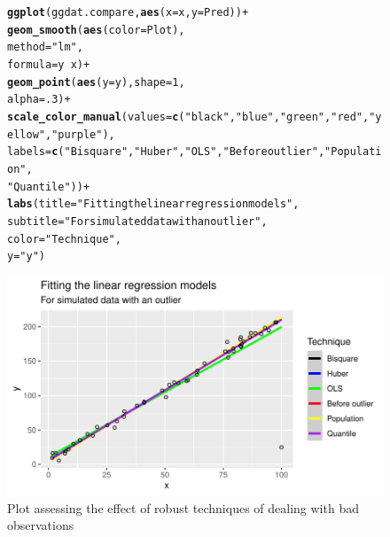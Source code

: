 \documentclass{article}\usepackage[]{graphicx}\usepackage[]{color}
\makeatletter
\def\maxwidth{ %
  \ifdim\Gin@nat@width>\linewidth
    \linewidth
  \else
    \Gin@nat@width
  \fi
}
\newcommand{\hlnum}[1]{\textcolor[rgb]{0.686,0.059,0.569}{#1}}%
\newcommand{\hlstr}[1]{\textcolor[rgb]{0.192,0.494,0.8}{#1}}%
\newcommand{\hlopt}[1]{\textcolor[rgb]{0,0,0}{#1}}%
\newcommand{\hlstd}[1]{\textcolor[rgb]{0.345,0.345,0.345}{#1}}%
\newcommand{\hlkwc}[1]{\textcolor[rgb]{0.333,0.667,0.333}{#1}}%
\newcommand{\hlkwd}[1]{\textcolor[rgb]{0.737,0.353,0.396}{\textbf{#1}}}%
\newenvironment{kframe}{%
 \def\at@end@of@kframe{}%
 \ifinner\ifhmode%
  \def\at@end@of@kframe{\end{minipage}}%
  \begin{minipage}{\columnwidth}%
 \fi\fi%
 \def\FrameCommand##1{\hskip\@totalleftmargin \hskip-\fboxsep
 \colorbox{shadecolor}{##1}\hskip-\fboxsep
     \hskip-\linewidth \hskip-\@totalleftmargin \hskip\columnwidth}%
 \MakeFramed {\advance\hsize-\width
   \@totalleftmargin\z@ \linewidth\hsize
   \@setminipage}}%
 {\par\unskip\endMakeFramed%
 \at@end@of@kframe}
\newenvironment{knitrout}{}{} %
\makeatother
\begin{document}
\begin{enumerate}
\begin{enumerate}
\begin{enumerate}
\begin{figure}[H]
\begin{center}
\begin{knitrout}
\color{fgcolor}\begin{kframe}
\begin{alltt}
\hlkwd{ggplot}\hlstd{(ggdat.compare,} \hlkwd{aes}\hlstd{(}\hlkwc{x}\hlstd{=x,} \hlkwc{y}\hlstd{=Pred))}\hlopt{+}
  \hlkwd{geom_smooth}\hlstd{(}\hlkwd{aes}\hlstd{(}\hlkwc{color}\hlstd{=Plot),}
              \hlkwc{method}\hlstd{=}\hlstr{"lm"}\hlstd{,}
              \hlkwc{formula}\hlstd{=y}\hlopt{~}\hlstd{x)}\hlopt{+}
  \hlkwd{geom_point}\hlstd{(}\hlkwd{aes}\hlstd{(}\hlkwc{y}\hlstd{=y),} \hlkwc{shape}\hlstd{=}\hlnum{1}\hlstd{,}
             \hlkwc{alpha}\hlstd{=}\hlnum{.3}\hlstd{)}\hlopt{+}
  \hlkwd{scale_color_manual}\hlstd{(}\hlkwc{values}\hlstd{=}\hlkwd{c}\hlstd{(}\hlstr{"black"}\hlstd{,} \hlstr{"blue"}\hlstd{,} \hlstr{"green"}\hlstd{,} \hlstr{"red"}\hlstd{,} \hlstr{"yellow"}\hlstd{,} \hlstr{"purple"}\hlstd{),}
                     \hlkwc{labels}\hlstd{=}\hlkwd{c}\hlstd{(}\hlstr{"Bisquare"}\hlstd{,} \hlstr{"Huber"}\hlstd{,} \hlstr{"OLS"}\hlstd{,} \hlstr{"Before outlier"}\hlstd{,} \hlstr{"Population"}\hlstd{,}
                              \hlstr{"Quantile"}\hlstd{))}\hlopt{+}
  \hlkwd{labs}\hlstd{(}\hlkwc{title}\hlstd{=}\hlstr{"Fitting the linear regression models"}\hlstd{,}
       \hlkwc{subtitle}\hlstd{=}\hlstr{"For simulated data with an outlier"}\hlstd{,}
       \hlkwc{color}\hlstd{=}\hlstr{"Technique"}\hlstd{,}
       \hlkwc{y}\hlstd{=}\hlstr{"y"}\hlstd{)}
\end{alltt}
\end{kframe}
\includegraphics[width=\maxwidth]{figure/p4plot5-1} 
\end{knitrout}
\caption{Plot assessing the effect of robust techniques of dealing with bad observations}
\label{p4plot5}
\end{center}
\end{figure}


\end{enumerate}
\end{enumerate}
\end{enumerate}
\end{document}
